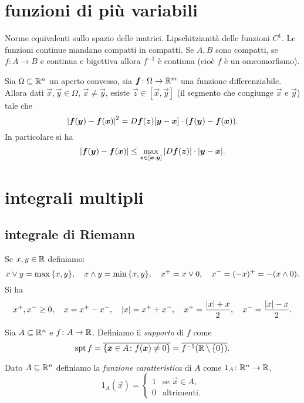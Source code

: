 \chapter{funzioni di più variabili}

Norme equivalenti sullo spazio delle matrici. Lipschitzianità delle funzioni $C^1$.
Le funzioni continue mandano compatti in compatti.
Se $A,B$ sono compatti, se $f\colon A\to B$ e continua e bigettiva allora 
$f^{-1}$ è continua (cioè $f$ è un omeomorfismo).


\begin{theorem}
  \label{th:lagrange}
Sia $\Omega\subseteq {\mathbb R}^n$ un aperto convesso, 
sia $\boldsymbol f\colon \Omega\to {\mathbb R}^m$ una funzione differenziabile.
Allora dati $\vec x,\vec y \in \Omega$, $\vec x\neq \vec y$, 
esiste $\vec z \in [\vec x,\vec y]$ (il segmento che congiunge $\vec x$ e $\vec y$)
tale che 
\[
 {\left|\boldsymbol f(\boldsymbol y)- \boldsymbol f(\boldsymbol x)\right|}^2
 =  D\boldsymbol f(\boldsymbol z)[\boldsymbol y-\boldsymbol x]\cdot (\boldsymbol f(\boldsymbol y)-\boldsymbol f(\boldsymbol x)).
\]
In particolare si ha 
\[
{\left|\boldsymbol f(\boldsymbol y)- \boldsymbol f(\boldsymbol x)\right|}
\le \max_{\boldsymbol z\in [\boldsymbol x,\boldsymbol y]} {\left|D\boldsymbol f(\boldsymbol z)\right|} \cdot {\left|\boldsymbol y-\boldsymbol x\right|}.
\]
\end{theorem}

\chapter{integrali multipli}

\section{integrale di Riemann}
Se $x,y\in {\mathbb R}$ definiamo:
\[
    x \vee y = \max{\left\{ x,y \right\}},
    \quad
    x \wedge y = \min{\left\{ x,y \right\}},
    \quad
    x^+ = x \vee 0,
    \quad
    x^- = (-x)^+ = -(x\wedge 0).
\]
Si ha
\[
    x^+,x^-\ge 0,
    \quad
    x = x^+ - x^-,
    \quad 
    {\left|x\right|} = x^+ + x^-,
    \quad
    x^+ = \frac{{\left|x\right|}+x}{2},
    \quad
    x^- = \frac{{\left|x\right|}-x}{2}.
\]

Sia $A\subseteq {\mathbb R}^n$ e $f\colon A \to {\mathbb R}$. 
Definiamo il \emph{supporto} di $f$ come 
\[
 \operatorname{spt} f 
    = \overline{{\left\{ \boldsymbol x \in A \colon f(\boldsymbol x) \neq 0 \right\}}}
    = \overline{f^{-1}({\mathbb R}\setminus{\left\{ 0 \right\}})}.
\]

Dato $A\subseteq {\mathbb R}^n$ definiamo la \emph{funzione caratteristica}
di $A$ come $1_A\colon {\mathbb R}^n \to {\mathbb R}$,
\[
  1_A(\vec x) = \begin{cases}
    1 & \text{se $\vec x \in A$,}\\
    0 & \text{altrimenti.}
  \end{cases}
\]

